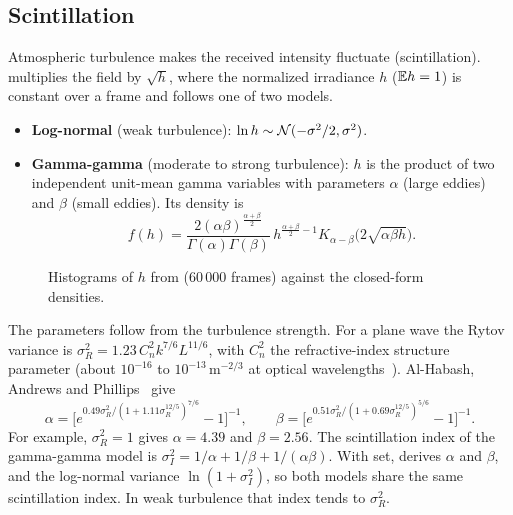 \subsection{Scintillation}
Atmospheric turbulence makes the received intensity fluctuate (scintillation). 
multiplies the field by $\sqrt h$, where the normalized irradiance $h$ ($\mathbb{E} h=1$) is constant
over a frame and follows one of two models.
\begin{itemize}
  \item \textbf{Log-normal} (weak turbulence): $\ln h\sim\mathcal{N}(-\sigma^2/2,\sigma^2)$.
  \item \textbf{Gamma-gamma} (moderate to strong turbulence): $h$ is the product of two
  independent unit-mean gamma variables with parameters $\alpha$ (large eddies) and $\beta$
  (small eddies). Its density is
  \begin{equation}
    f(h)=\frac{2(\alpha\beta)^{\frac{\alpha+\beta}{2}}}{\Gamma(\alpha)\Gamma(\beta)}\,h^{\frac{\alpha+\beta}{2}-1}K_{\alpha-\beta}\big(2\sqrt{\alpha\beta h}\big).
  \end{equation}
\end{itemize}

\begin{figure}[htbp]
\centering
{}
\caption{Histograms of $h$ from  (60\,000 frames) against the closed-form densities.}
\label{fig:fso}
\end{figure}

The parameters follow from the turbulence strength. For a plane wave the Rytov variance is
$\sigma_R^2=1.23\,C_n^2k^{7/6}L^{11/6}$, with $C_n^2$ the refractive-index structure parameter
(about $10^{-16}$ to $10^{-13}$\,m$^{-2/3}$ at optical wavelengths~\cite{p1814}). Al-Habash, Andrews and
Phillips~\cite{alhabash2001} give
\begin{equation}
  \alpha=\Big[e^{0.49\sigma_R^2/(1+1.11\sigma_R^{12/5})^{7/6}}-1\Big]^{-1},\qquad
  \beta=\Big[e^{0.51\sigma_R^2/(1+0.69\sigma_R^{12/5})^{5/6}}-1\Big]^{-1}.
\end{equation}
For example, $\sigma_R^2=1$ gives $\alpha=4.39$ and $\beta=2.56$. The scintillation index of the
gamma-gamma model is $\sigma_I^2=1/\alpha+1/\beta+1/(\alpha\beta)$. With  set,
 derives $\alpha$ and $\beta$, and the log-normal variance
$\ln(1+\sigma_I^2)$, so both models share the same scintillation index. In weak turbulence that
index tends to $\sigma_R^2$.

